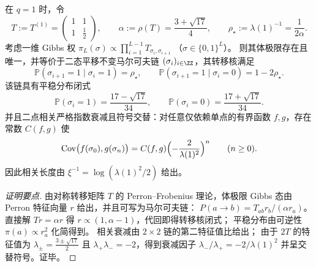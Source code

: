 \begin{proposition}[\texorpdfstring{$q=1$}{q=1} 的完全可解马尔可夫化：平稳分布、转移核与交替相关长度]\label{prop:pom-multiplicity-composition-q1-markov}
在 \(q=1\) 时，令
\[
T:=T^{(1)}=\begin{pmatrix}1&1\\[2pt]1&\tfrac12\end{pmatrix},
\qquad
\alpha:=\rho(T)=\frac{3+\sqrt{17}}{4},
\qquad
\rho_\star:=\lambda(1)^{-1}=\frac{1}{2\alpha}.
\]
考虑一维 Gibbs 权
\(
\pi_L(\sigma)\propto \prod_{i=1}^{L-1}T_{\sigma_i,\sigma_{i+1}}
\)
（\(\sigma\in\{0,1\}^L\)）。
则其体极限存在且唯一，并等价于二态平移不变马尔可夫链 \((\sigma_i)_{i\in\ZZ}\)，其转移核满足
\[
\boxed{\;
\mathbb{P}(\sigma_{i+1}=1\mid\sigma_i=1)=\rho_\star,\qquad
\mathbb{P}(\sigma_{i+1}=1\mid\sigma_i=0)=1-2\rho_\star.\;}
\]
该链具有平稳分布闭式
\[
\boxed{\;
\mathbb{P}(\sigma_i=1)=\frac{17-\sqrt{17}}{34},\qquad
\mathbb{P}(\sigma_i=0)=\frac{17+\sqrt{17}}{34}.\;}
\]
并且二点相关严格指数衰减且符号交替：对任意仅依赖单点的有界函数 \(f,g\)，存在常数 \(C(f,g)\) 使
\[
\mathrm{Cov}\bigl(f(\sigma_0),g(\sigma_n)\bigr)
=C(f,g)\Bigl(-\frac{2}{\lambda(1)^2}\Bigr)^{n}\qquad(n\ge 0).
\]
因此相关长度由 \(\xi^{-1}=\log(\lambda(1)^2/2)\) 给出。
\end{proposition}
\begin{proof}[证明要点]
由对称转移矩阵 \(T\) 的 Perron--Frobenius 理论，体极限 Gibbs 态由 Perron 特征向量 \(r\) 给出，并且可写为马尔可夫链：
\(
P(a\to b)=T_{ab}r_b/(\alpha r_a)
\)。
直接解 \(Tr=\alpha r\) 得 \(r\propto(1,\alpha-1)\)，代回即得转移核闭式；
平稳分布由可逆性 \(\pi(a)\propto r_a^2\) 化简得到。
相关衰减由 \(2\times 2\) 链的第二特征值比给出；
由于 \(2T\) 的特征值为 \(\lambda_\pm=\frac{3\pm\sqrt{17}}{2}\) 且 \(\lambda_+\lambda_-=-2\)，得到衰减因子
\(
\lambda_-/\lambda_+=-2/\lambda(1)^2
\)
并呈交替符号。证毕。
\end{proof}

